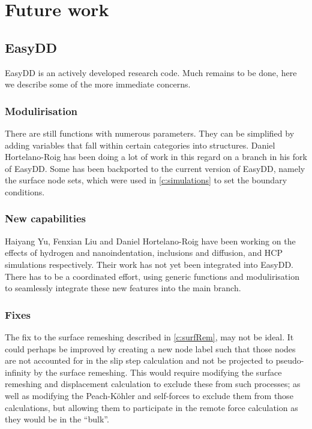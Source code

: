 \chapter{Future work}
\label{c:future}

\section{EasyDD}

EasyDD is an actively developed research code. Much remains to be done, here we describe some of the more immediate concerns.

\subsection{Modulirisation}

There are still functions with numerous parameters. They can be simplified by adding variables that fall within certain categories into structures. Daniel Hortelano-Roig has been doing a lot of work in this regard on a branch in his fork of EasyDD. Some has been backported to the current version of EasyDD, namely the surface node sets, which were used in \cref{c:simulations} to set the boundary conditions.

\subsection{New capabilities}

Haiyang Yu, Fenxian Liu and Daniel Hortelano-Roig have been working on the effects of hydrogen and nanoindentation, inclusions and diffusion, and HCP simulations respectively. Their work has not yet been integrated into EasyDD. There has to be a coordinated effort, using generic functions and modulirisation to seamlessly integrate these new features into the main branch.

\subsection{Fixes}

The fix to the surface remeshing described in \cref{c:surfRem}, may not be ideal. It could perhaps be improved by creating a new node label such that those nodes are not accounted for in the slip step calculation and not be projected to pseudo-infinity by the surface remeshing. This would require modifying the surface remeshing and displacement calculation to exclude these from such processes; as well as modifying the Peach-K\"{o}hler and self-forces to exclude them from those calculations, but allowing them to participate in the remote force calculation as they would be in the ``bulk''.

